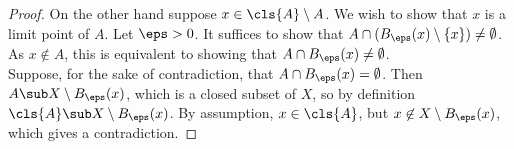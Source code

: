\documentclass[12pt]{article}
\begin{document}
\begin{homeworkProblem}
\begin{proof}
    On the other hand suppose $ x\in \cls{A}\setminus A $. We wish to show that $ x $ is a limit point of $ A $. Let $ \eps>0 $. It suffices to show that $ A\cap (B_{\eps}(x)\setminus \{x\}) \neq \emptyset $. As $ x\not \in A $, this is equivalent to showing that $ A\cap B_{\eps}(x) \neq \emptyset $.\\

    Suppose, for the sake of contradiction, that $ A\cap B_{\eps}(x) = \emptyset $. Then $ A\sub X\setminus B_{\eps}(x) $, which is a closed subset of $ X $, so by definition $ \cls{A}\sub X\setminus B_{\eps}(x) $. By assumption, $ x\in \cls{A} $, but $ x\not\in X\setminus B_{\eps}(x) $, which gives a contradiction.
  \end{proof}

\end{homeworkProblem}
\end{document}
